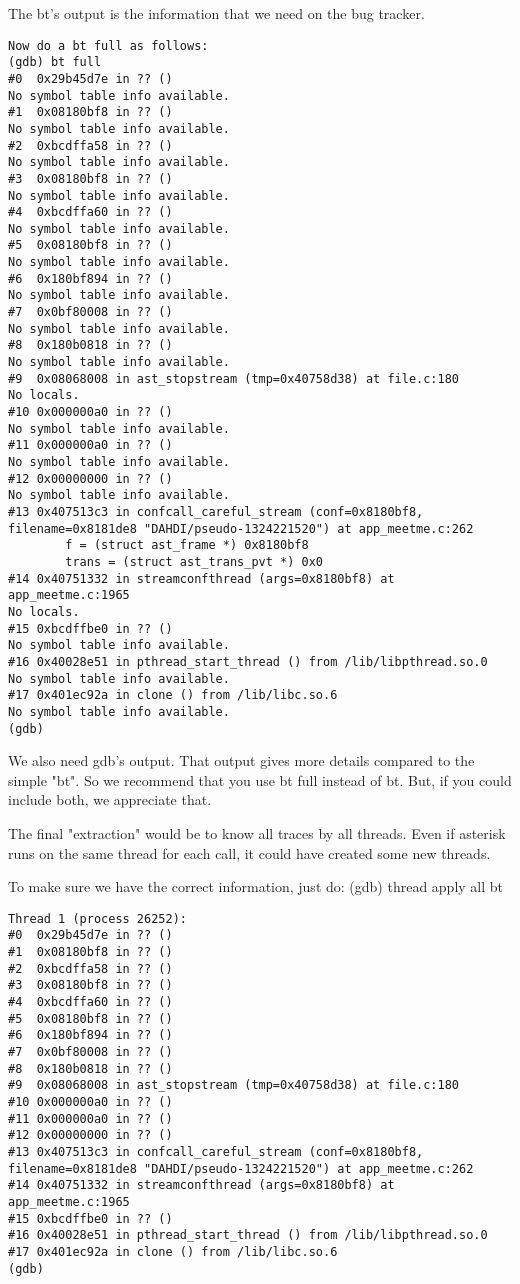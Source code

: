 The bt's output is the information that we need on the bug tracker.

\begin{astlisting}
\begin{verbatim}
Now do a bt full as follows:
(gdb) bt full
#0  0x29b45d7e in ?? ()
No symbol table info available.
#1  0x08180bf8 in ?? ()
No symbol table info available.
#2  0xbcdffa58 in ?? ()
No symbol table info available.
#3  0x08180bf8 in ?? ()
No symbol table info available.
#4  0xbcdffa60 in ?? ()
No symbol table info available.
#5  0x08180bf8 in ?? ()
No symbol table info available.
#6  0x180bf894 in ?? ()
No symbol table info available.
#7  0x0bf80008 in ?? ()
No symbol table info available.
#8  0x180b0818 in ?? ()
No symbol table info available.
#9  0x08068008 in ast_stopstream (tmp=0x40758d38) at file.c:180
No locals.
#10 0x000000a0 in ?? ()
No symbol table info available.
#11 0x000000a0 in ?? ()
No symbol table info available.
#12 0x00000000 in ?? ()
No symbol table info available.
#13 0x407513c3 in confcall_careful_stream (conf=0x8180bf8, filename=0x8181de8 "DAHDI/pseudo-1324221520") at app_meetme.c:262
        f = (struct ast_frame *) 0x8180bf8
        trans = (struct ast_trans_pvt *) 0x0
#14 0x40751332 in streamconfthread (args=0x8180bf8) at app_meetme.c:1965
No locals.
#15 0xbcdffbe0 in ?? ()
No symbol table info available.
#16 0x40028e51 in pthread_start_thread () from /lib/libpthread.so.0
No symbol table info available.
#17 0x401ec92a in clone () from /lib/libc.so.6
No symbol table info available.
(gdb)
\end{verbatim}
\end{astlisting}

We also need gdb's output. That output gives more details compared to
the simple "bt". So we recommend that you use bt full instead of bt.
But, if you could include both, we appreciate that.

The final "extraction" would be to know all traces by all
threads. Even if asterisk runs on the same thread for each call, it
could have created some new threads.

To make sure we have the correct information, just do:
(gdb) thread apply all bt

\begin{astlisting}
\begin{verbatim}
Thread 1 (process 26252):
#0  0x29b45d7e in ?? ()
#1  0x08180bf8 in ?? ()
#2  0xbcdffa58 in ?? ()
#3  0x08180bf8 in ?? ()
#4  0xbcdffa60 in ?? ()
#5  0x08180bf8 in ?? ()
#6  0x180bf894 in ?? ()
#7  0x0bf80008 in ?? ()
#8  0x180b0818 in ?? ()
#9  0x08068008 in ast_stopstream (tmp=0x40758d38) at file.c:180
#10 0x000000a0 in ?? ()
#11 0x000000a0 in ?? ()
#12 0x00000000 in ?? ()
#13 0x407513c3 in confcall_careful_stream (conf=0x8180bf8, filename=0x8181de8 "DAHDI/pseudo-1324221520") at app_meetme.c:262
#14 0x40751332 in streamconfthread (args=0x8180bf8) at app_meetme.c:1965
#15 0xbcdffbe0 in ?? ()
#16 0x40028e51 in pthread_start_thread () from /lib/libpthread.so.0
#17 0x401ec92a in clone () from /lib/libc.so.6
(gdb)
\end{verbatim}
\end{astlisting}

